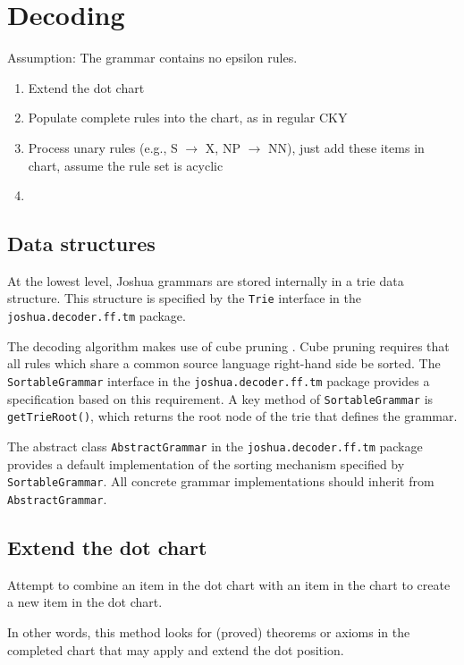 \chapter{Decoding}

Assumption: The grammar contains no epsilon rules.

\begin{enumerate}
\item Extend the dot chart
\item Populate complete rules into the chart, as in regular CKY
\item Process unary rules (e.g., S $\rightarrow$ X, NP $\rightarrow$ NN), just add these items in chart, assume the rule set is acyclic
\item 
\end{enumerate}


\section{Data structures}

At the lowest level, Joshua grammars are stored internally in a trie data structure. This structure is specified by the {\tt Trie} interface in the {\tt joshua.decoder.ff.tm} package.

The decoding algorithm makes use of cube pruning \cite{chiang07}. Cube pruning requires that all rules which share a common source language right-hand side be sorted. The {\tt SortableGrammar} interface in the {\tt joshua.decoder.ff.tm} package provides a specification based on this requirement. A key method of {\tt SortableGrammar} is {\tt getTrieRoot()}, which returns the root node of the trie that defines the grammar.

The abstract class {\tt AbstractGrammar} in the {\tt joshua.decoder.ff.tm} package provides a default implementation of the sorting mechanism specified by {\tt SortableGrammar}. All concrete grammar implementations should inherit from {\tt AbstractGrammar}.


\section{Extend the dot chart}

Attempt to combine an item in the dot chart
with an item in the chart to create a new item
in the dot chart.

In other words, this method looks 
for (proved) theorems or axioms in the completed chart
that may apply and extend the dot position.

